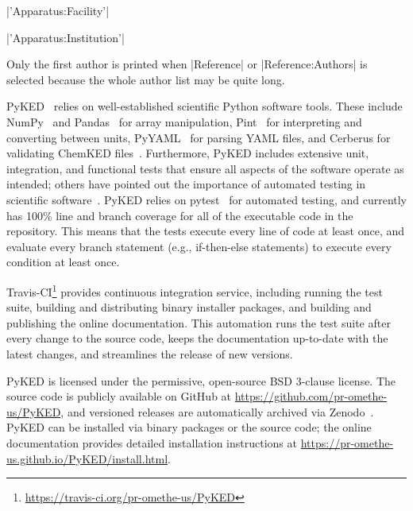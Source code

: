 \documentclass[12pt]{ijck}
\newcommand\ck{ChemKED}
\newcommand\pk{PyKED}
\begin{document}
\noindent\begin{itemize*}
    \item \pybox|'Apparatus:Facility'|
    \item \pybox|'Apparatus:Institution'|
\end{itemize*}

Only the first author is printed when \pybox|Reference| or
\pybox|Reference:Authors| is selected because the whole author list may be
quite long.

\pk{}~\autocite{PyKED} relies on well-established scientific Python software tools.
These include NumPy~\autocite{vanderWalt:2011np} and Pandas~\autocite{pandas,McKinney2010}
for array manipulation, Pint~\autocite{Grecco2016} for interpreting and converting
between units, PyYAML~\autocite{pyyaml} for parsing YAML
files, and Cerberus for validating \ck{} files~\autocite{cerberus}.
Furthermore, \pk{} includes extensive unit, integration, and functional tests
that ensure all aspects of the software operate as intended; others have pointed
out the importance of automated testing in scientific software~\autocite{Wilson:bestpractices}.
\pk{} relies on pytest~\autocite{pytest:3.0.1} for automated testing, and currently has
100\% line and branch coverage for all of the executable code in the repository. This
means that the tests execute every line of code at least once, and evaluate
every branch statement (e.g., if-then-else statements) to execute every condition
at least once.

Travis-CI\footnote{\url{https://travis-ci.org/pr-omethe-us/PyKED}} provides continuous
integration service, including running the test suite, building and distributing binary
installer packages, and building and publishing the online documentation. This automation
runs the test suite after every change to the source code, keeps the documentation
up-to-date with the latest changes, and streamlines the release of new versions.

\pk{} is licensed under the permissive, open-source BSD 3-clause license. The
source code is publicly available on GitHub at \url{https://github.com/pr-omethe-us/PyKED},
and versioned releases are automatically archived via Zenodo~\autocite{PyKED}.
\pk{} can be installed via binary packages or the source code; the online documentation
provides detailed installation instructions at
\url{https://pr-omethe-us.github.io/PyKED/install.html}.

\end{document}
